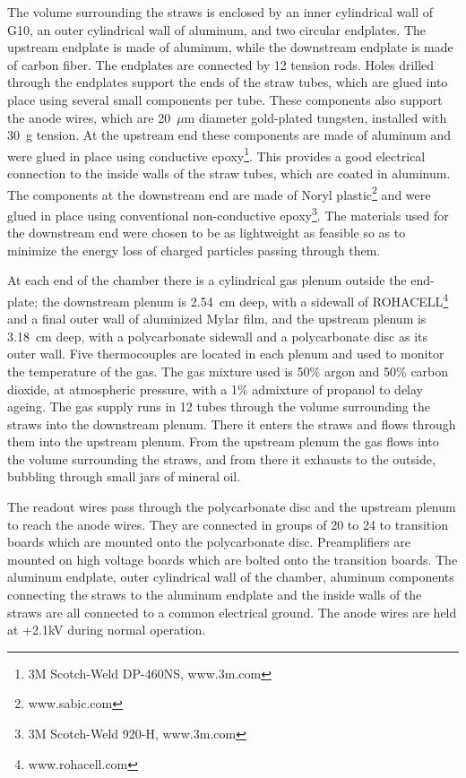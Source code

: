 The volume surrounding the straws is enclosed by an inner cylindrical wall of G10, an outer cylindrical wall of aluminum, and two circular endplates. 
The upstream endplate is made of aluminum, while the downstream endplate is made of carbon fiber. The endplates are connected by 12 tension rods. 
Holes drilled through the endplates support the ends of the straw tubes, which are glued into place using several small components per tube.  
These components also support the anode wires, which are 20~$\mu$m diameter gold-plated tungsten, installed with 30~g tension.
At the upstream end these components are made of aluminum and were glued in place using conductive epoxy\footnote{3M Scotch-Weld DP-460NS, www.3m.com}. 
This provides a good electrical connection to the inside walls of the straw tubes, which are coated in aluminum.
The components at the downstream end are made of Noryl plastic\footnote{www.sabic.com} and were glued in place using conventional non-conductive epoxy\footnote{3M Scotch-Weld 920-H, www.3m.com}.
The materials used for the downstream end were chosen to be as lightweight as feasible so as to minimize the energy loss of charged particles passing through them. 

At each end of the chamber there is a cylindrical gas plenum outside the end-plate; the downstream plenum is 2.54~cm deep, with a sidewall of ROHACELL\footnote{www.rohacell.com} and a final outer wall of aluminized Mylar film, and the upstream plenum is 3.18~cm deep, with a polycarbonate sidewall and a polycarbonate disc as its outer wall. 
Five thermocouples are located in each plenum and used to monitor the temperature of the gas.
The gas mixture used is 50$\%$ argon and 50$\%$ carbon dioxide, at atmospheric pressure, with a 1$\%$ admixture of propanol to delay ageing.
The gas supply runs in 12 tubes through the volume surrounding the straws into the downstream plenum. 
There it enters the straws and flows through them into the upstream plenum. From the upstream plenum the gas flows into the volume surrounding the straws, and from there it exhausts to the outside, bubbling through small jars of mineral oil.

The readout wires pass through the polycarbonate disc and the upstream plenum to reach the anode wires. 
They are connected in groups of 20 to 24 to transition boards which are mounted onto the polycarbonate disc. 
Preamplifiers\cite{hdnote2515} are mounted on high voltage boards which are bolted onto the transition boards. The aluminum endplate, outer cylindrical wall of the chamber, aluminum components connecting the straws to the aluminum endplate and the inside walls of the straws are all connected to a common electrical ground. 
The anode wires are held at +2.1kV during normal operation. 


